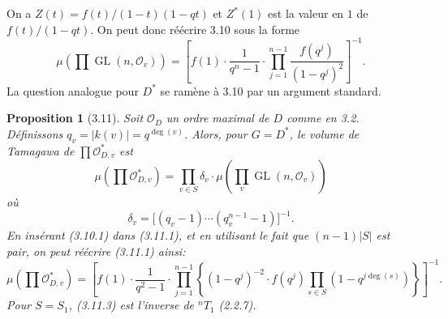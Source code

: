 \documentclass[10pt]{article}
\newcommand{\GL}{\operatorname{GL}}
\newcommand{\degm}{\operatorname{deg}}
\newcommand{\OD}{\mathcal O_D}
\newcommand{\OO}{\mathcal O}
\theoremstyle{deligne}
\newtheorem*{proposition*}{Proposition}
\begin{document}
On a $Z(t)=f(t)/(1-t)(1-qt)$ et $Z^*(1)$ est la valeur en $1$ de $f(t)/(1-qt)$. On peut donc réécrire 3.10 sous la forme
\begin{equation}\tag{3.10.1}
\mu\left(\prod\GL(n,\OO_v)\right)=
\left[f(1)\cdot\frac{1}{q^n-1}\cdot\prod_{j=1}^{n-1}\frac{f(q^j)}{(1-q^j)^2}\right]^{-1}.
\end{equation}
La question analogue pour $D^*$ se ramène à 3.10 par un argument standard.

\begin{proposition*}[3.11]
Soit $\OD$ un ordre maximal de $D$ comme en 3.2. Définissons $q_v=|k(v)|=q^{\degm(v)}$. Alors, pour $G=D^*$, le volume de Tamagawa de $\prod \mathcal O_{D,v}^*$ est
\begin{equation}\tag{3.11.1}
\mu\left(\prod \mathcal O_{D,v}^*\right)=\prod_{v\in S}\delta_v\cdot\mu\left(\prod_v\GL(n,\OO_v)\right)
\end{equation}
où
\begin{equation}\tag{3.11.2}
\delta_v=\bigl[(q_v-1)\cdots(q_v^{n-1}-1)\bigr]^{-1}.
\end{equation}
En insérant (3.10.1) dans (3.11.1), et en utilisant le fait que $(n-1)|S|$ est pair, on peut réécrire (3.11.1) ainsi:
\begin{equation}\tag{3.11.3}
\mu\left(\prod\mathcal O_{D,v}^*\right)=
\left[f(1)\cdot\frac{1}{q^2-1}\cdot\prod_{j=1}^{n-1}\left\{(1-q^j)^{-2}\cdot f(q^j)\prod_{s\in S}(1-q^{j\degm(s)})\right\}\right]^{-1}.
\end{equation}
Pour $S=S_1$, (3.11.3) est l'inverse de ${}^nT_1$ (2.2.7).
\end{proposition*}
\end{document}
